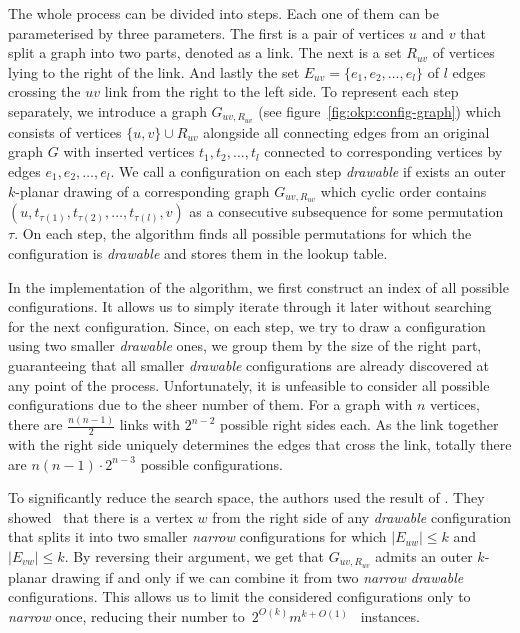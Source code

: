 The whole process can be divided into steps. Each one of them can be parameterised by three parameters. The first is a pair of vertices \(u\) and \(v\) that split a graph into two parts, denoted as a link. The next is a set \(R_{uv}\) of vertices lying to the right of the link. And lastly the set \(E_{uv} = \{e_1, e_2, \dots, e_l\}\) of \(l\) edges crossing the \(uv\) link from the right to the left side. To represent each step separately, we introduce a graph \(G_{uv, R_{uv}}\) (see figure~\ref{fig:okp:config-graph}) which consists of vertices \(\{u, v\} \cup R_{uv}\) alongside all connecting edges from an original graph \(G\) with inserted vertices \(t_1, t_2, \dots, t_l\) connected to corresponding vertices by edges \(e_1, e_2, \dots, e_l\). We call a configuration on each step \emph{drawable} if exists an outer \(k\)-planar drawing of a corresponding graph \(G_{uv, R_{uv}}\) which cyclic order contains \((u, t_{\tau(1)}, t_{\tau(2)}, \dots, t_{\tau(l)}, v)\) as a consecutive subsequence for some permutation \(\tau\). On each step, the algorithm finds all possible permutations for which the configuration is \emph{drawable} and stores them in the lookup table.

In the implementation of the algorithm, we first construct an index of all possible configurations. It allows us to simply iterate through it later without searching for the next configuration. Since, on each step, we try to draw a configuration using two smaller \emph{drawable} ones, we group them by the size of the right part, guaranteeing that all smaller \emph{drawable} configurations are already discovered at any point of the process. Unfortunately, it is unfeasible to consider all possible configurations due to the sheer number of them. For a graph with \(n\) vertices, there are \(\frac{n(n-1)}{2}\) links with \(2^{n-2}\) possible right sides each. As the link together with the right side uniquely determines the edges that cross the link, totally there are \(n(n-1)\cdot2^{n-3}\) possible configurations.

To significantly reduce the search space, the authors used the result of \citeauthor{triangulations}. They showed~\cite{triangulations} that there is a vertex \(w\) from the right side of any \emph{drawable} configuration that splits it into two smaller \emph{narrow} configurations for which \(|E_{uw}| \leqslant k\) and \(|E_{vw}| \leqslant k\). By reversing their argument, we get that \(G_{uv, R_{uv}}\) admits an outer \(k\)-planar drawing if and only if we can combine it from two \emph{narrow drawable} configurations. This allows us to limit the considered configurations only to \emph{narrow} once, reducing their number to~\(2^{O(k)}m^{k+O(1)}\)~\cite[Lemma 15]{okp} instances.

